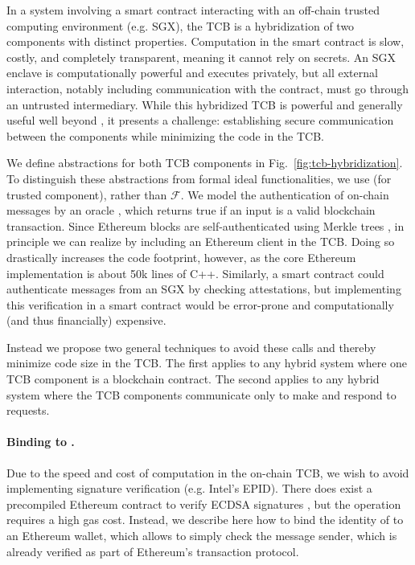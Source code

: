 In a system involving a smart contract interacting with an off-chain trusted computing environment (e.g. SGX),
the TCB is a hybridization of two components with distinct properties.
Computation in the smart contract is slow, costly, and completely transparent, meaning it cannot rely on secrets.
An SGX enclave is computationally powerful and executes privately, but all external interaction, notably including communication with the contract, must go through an untrusted intermediary. While this hybridized TCB is powerful and generally useful well beyond \tc, it presents a challenge: establishing secure communication between the components while minimizing the code in the TCB.

We define abstractions for both TCB components in Fig.~\ref{fig:tcb-hybridization}.
To distinguish these abstractions from formal ideal functionalities, we use \tcb (for trusted component), rather than $\mathcal{F}$.
We model the authentication of on-chain messages by an oracle \oauth, which returns true if an input is a valid blockchain transaction.
Since Ethereum blocks are self-authenticated using Merkle trees \cite{whitepaper,yellowpaper},
in principle we can realize \oauth by including an Ethereum client in the TCB.
Doing so drastically increases the code footprint, however, as the core Ethereum implementation is about 50k lines of C++.
Similarly, a smart contract could authenticate messages from an SGX by checking attestations,
but implementing this verification in a smart contract would be error-prone and computationally (and thus financially) expensive.

Instead we propose two general techniques to avoid these calls and thereby minimize code size in the TCB.
The first applies to any hybrid system where one TCB component is a blockchain contract.
The second applies to any hybrid system where the TCB components communicate only to make and respond to requests.


\paragraph{Binding \tcboff to \tcadd.}
Due to the speed and cost of computation in the on-chain TCB, we wish to avoid implementing signature verification (e.g. Intel's EPID).
There does exist a precompiled Ethereum contract to verify ECDSA signatures \cite{yellowpaper}, but the operation requires a high gas cost.
Instead, we describe here how to bind the identity of \tcboff to an Ethereum wallet, which allows \tcbon to simply check the message sender,
which is already verified as part of Ethereum's transaction protocol.

